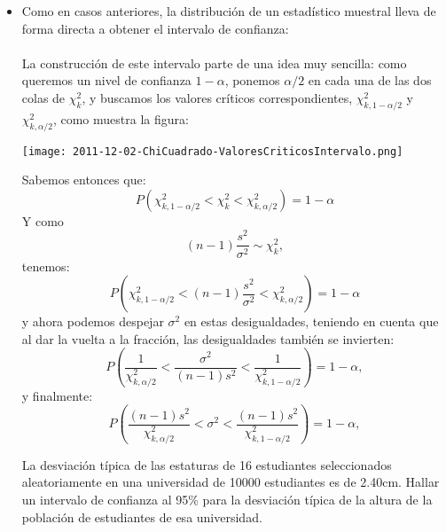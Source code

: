 \begin{itemize}
    \item Como en casos anteriores, la distribución de un estadístico muestral lleva de forma directa a obtener el intervalo de confianza:\\[3mm]
       \\[3mm]
       La construcción de este intervalo parte de una idea muy sencilla: como queremos un nivel de confianza $1-\alpha$, ponemos $\alpha/2$ en cada una de las dos colas de $\chi^2_k$, y buscamos los valores críticos correspondientes, $\chi^2_{k,1-\alpha/2}$ y $\chi^2_{k,\alpha/2}$, como muestra la figura:
       \begin{center}
       \texttt{[image: 2011-12-02-ChiCuadrado-ValoresCriticosIntervalo.png]}
       \end{center}
       Sabemos entonces que:
       \[P(\chi^2_{k,1-\alpha/2}<\chi^2_k<\chi^2_{k,\alpha/2})=1-\alpha\]
       Y como
       \[(n-1)\dfrac{s^2}{\sigma^2}\sim\chi^2_k,\]
       tenemos:
       \[P\left(\chi^2_{k,1-\alpha/2}<(n-1)\dfrac{s^2}{\sigma^2}<\chi^2_{k,\alpha/2}\right)=1-\alpha\]
       y ahora podemos despejar $\sigma^2$ en estas desigualdades, teniendo en cuenta que al dar la vuelta a la fracción, las desigualdades también se invierten:
       \[P\left(
       \dfrac{1}{\chi^2_{k,\alpha/2}}<\dfrac{\sigma^2}{(n-1)s^2}<\dfrac{1}{\chi^2_{k,1-\alpha/2}}
       \right)=1-\alpha,\]
       y finalmente:
       \[P\left(
       \dfrac{(n-1)s^2}{\chi^2_{k,\alpha/2}}<\sigma^2<\dfrac{(n-1)s^2}{\chi^2_{k,1-\alpha/2}}
       \right)=1-\alpha,\]
       \begin{ejemplo}
       La desviación típica de las estaturas de 16 estudiantes seleccionados aleatoriamente en una universidad de 10000 estudiantes es de 2.40cm. Hallar un intervalo de confianza al 95\% para la desviación típica de la altura de la población de estudiantes de esa universidad.\\

\end{ejemplo}
\end{itemize}
